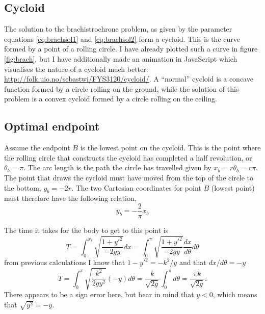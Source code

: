 \documentclass[11pt]{amsart}
\begin{document}
\subsection{Cycloid}
The solution to the brachistrochrone problem, as given by the parameter equations \ref{eq:brachsol1} and \ref{eq:brachsol2} form a cycloid. This is the curve formed by a point of a rolling circle. I have already plotted such a curve in figure \ref{fig:brach}, but I have additionally made an animation in JavaScript which visualises the nature of a cycloid much better: \url{http://folk.uio.no/sebastwi/FYS3120/cycloid/}. A ``normal'' cycloid is a concave function formed by a circle rolling on the ground, while the solution of this problem is a convex cycloid formed by a circle rolling on the ceiling. 

\subsection{Optimal endpoint}
Assume the endpoint $B$ is the lowest point on the cycloid. This is the point where the rolling circle that constructs the cycloid has completed a half revolution, or $\theta_b = \pi$. The arc length is the path the circle has travelled given by $x_b = r\theta_b = r\pi$. The point that draws the cycloid must have moved from the top of the circle to the bottom, $y_b = -2r$. The two Cartesian coordinates for point $B$ (lowest point) must therefore have the following relation,
\begin{equation}
y_b = -\frac{2}{\pi}x_b
\end{equation}

The time it takes for the body to get to this point is
\begin{equation*}
T = \int_0^{x_b}\sqrt{\frac{1+y'^2}{-2gy}}dx = \int_0^{\pi}\sqrt{\frac{1+y'^2}{-2gy}}\frac{dx}{d\theta}d\theta
\end{equation*}
from previous calculations I know that $1-y'^2 = -k^2/y$ and that $dx/d\theta= -y$ 
\begin{equation}
\label{eq:cycloidperiod}
T = \int_0^\pi\sqrt{\frac{k^2}{2gy^2}}(-y)d\theta = \frac{k}{\sqrt{2g}}\int_0^\pi d\theta = \frac{\pi k}{\sqrt{2g}}.
\end{equation}
There appears to be a sign error here, but bear in mind that $y<0$, which means that $\sqrt{y^2}=-y$.
\end{document}
